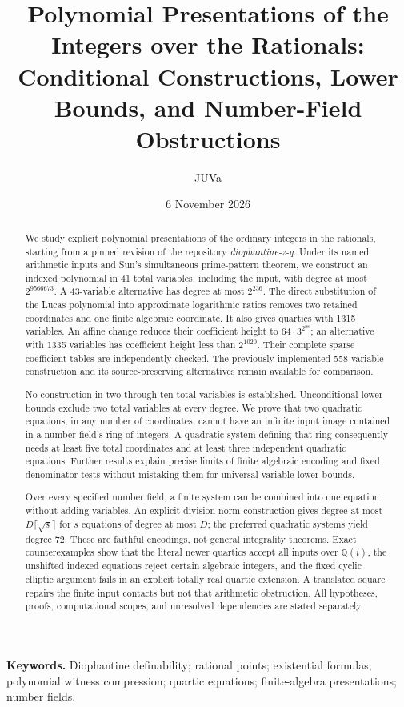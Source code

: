 \documentclass[11pt]{article}
\title{Polynomial Presentations of the Integers over the Rationals:\\
Conditional Constructions, Lower Bounds, and Number-Field Obstructions}
\author{JUVa}
\date{6 November 2026}
\theoremstyle{definition}
\begin{document}
\maketitle
\begin{abstract}
We study explicit polynomial presentations of the ordinary integers in
the rationals, starting from a pinned revision of the repository
\emph{diophantine-z-q}. Under its named arithmetic inputs and Sun's
simultaneous prime-pattern theorem, we construct an indexed polynomial
in 41 total variables, including the input, with degree at most
$2^{9566673}$. A 43-variable alternative has degree at most $2^{236}$.
The direct substitution of the Lucas polynomial into approximate
logarithmic ratios removes two retained coordinates and one finite
algebraic coordinate. It also gives quartics with 1315 variables.
An affine change reduces their coefficient height to $64\cdot3^{2^{28}}$;
an alternative with 1335 variables has coefficient height less than $2^{1020}$.
Their complete sparse coefficient tables are independently checked.
The previously implemented 558-variable construction and its
source-preserving alternatives remain available for comparison.

No construction in two through ten total variables is established.
Unconditional lower bounds exclude two total variables at every
degree. We prove that two quadratic equations, in any number of
coordinates, cannot have an infinite input image contained in a
number field's ring of integers. A quadratic system defining that
ring consequently needs at least five total coordinates and at
least three independent quadratic equations. Further results explain
precise limits of finite algebraic encoding and fixed denominator
tests without mistaking them for universal variable lower bounds.

Over every specified number field, a finite system can be combined
into one equation without adding variables. An explicit division-norm
construction gives degree at most $D\lceil\sqrt{s}\rceil$ for $s$
equations of degree at most $D$; the preferred quadratic systems yield
degree 72. These are faithful encodings, not general integrality
theorems. Exact counterexamples show that the literal newer quartics
accept all inputs over $\mathbb Q(i)$, the unshifted indexed equations
reject certain algebraic integers, and the fixed cyclic elliptic
argument fails in an explicit totally real quartic extension.
A translated square repairs the finite input contacts but not that
arithmetic obstruction. All hypotheses, proofs, computational scopes,
and unresolved dependencies are stated separately.
\end{abstract}
\medskip
\noindent\textbf{Keywords.} Diophantine definability; rational points;
existential formulas; polynomial witness compression; quartic equations;
finite-algebra presentations; number fields.
\tableofcontents
\end{document}
